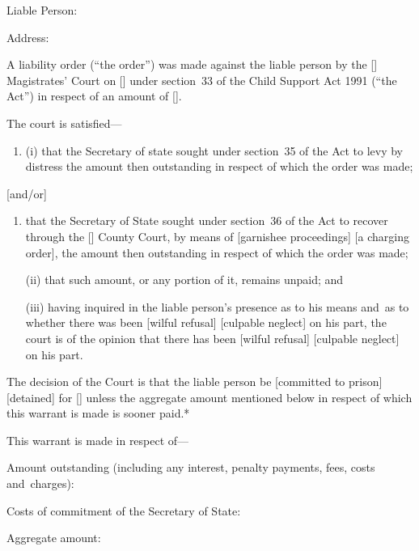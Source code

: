 \documentclass[12pt,a4paper]{article}
\begin{document}
Liable Person:

\medskip

Address:

\medskip

A liability order (``the order'') was made against the liable person by the [\phantom{Bolton}] Magistrates' Court on [\phantom{\today}] under section~33 of the Child Support Act 1991 (``the Act'') in respect of an amount of [\phantom{£100.00}].

The court is satisfied---
\begin{enumerate}
\item[]
(i) that the Secretary of state sought under section~35 of the Act to levy by distress the amount then outstanding in respect of which the order was made;
\end{enumerate}
[and/or]
\begin{enumerate}\item[]
that the Secretary of State sought under section~36 of the Act to recover through the [\phantom{Bolton}] County Court, by means of [garnishee proceedings] 
[a charging order], the amount then outstanding in respect of which the order was made;

(ii) that such amount, or any portion of it, remains unpaid; and

(iii) having inquired in the liable person's presence as to his means and~as to whether there was been [wilful refusal] 
[culpable neglect] on his part, the court is of the opinion that there has been [wilful refusal] 
[culpable neglect] on his part.
\end{enumerate}

The decision of the Court is that the liable person be [committed to prison] [detained] for [\phantom{7 days}] unless the aggregate amount mentioned below in respect of which this warrant is made is sooner paid.*

\medskip

This warrant is made in respect of---

Amount outstanding (including any interest, 
penalty payments, fees,  %
costs and~charges):

Costs of commitment of the Secretary of State:

\medskip

Aggregate amount:
\end{document}
